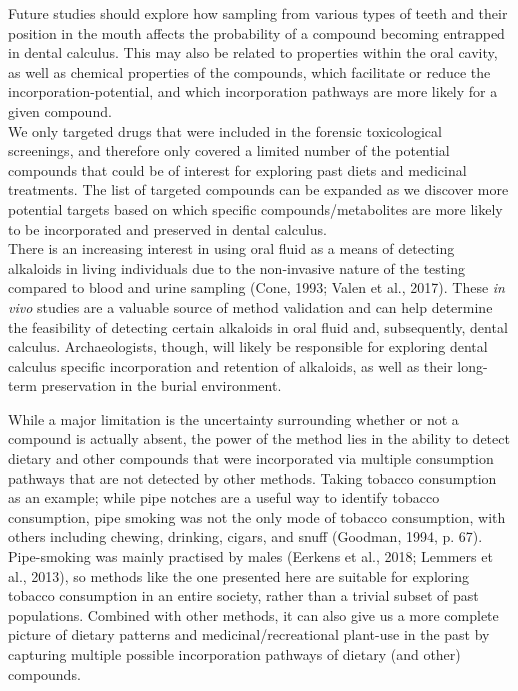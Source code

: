 \documentclass[
]{article}
\begin{document}
Future studies should explore how sampling from various types of teeth
and their position in the mouth affects the probability of a compound
becoming entrapped in dental calculus. This may also be related to
properties within the oral cavity, as well as chemical properties of the
compounds, which facilitate or reduce the incorporation-potential, and
which incorporation pathways are more likely for a given compound.\\
We only targeted drugs that were included in the forensic toxicological
screenings, and therefore only covered a limited number of the potential
compounds that could be of interest for exploring past diets and
medicinal treatments. The list of targeted compounds can be expanded as
we discover more potential targets based on which specific
compounds/metabolites are more likely to be incorporated and preserved
in dental calculus.\\
There is an increasing interest in using oral fluid as a means of
detecting alkaloids in living individuals due to the non-invasive nature
of the testing compared to blood and urine sampling (Cone, 1993; Valen
et al., 2017). These \emph{in vivo} studies are a valuable source of
method validation and can help determine the feasibility of detecting
certain alkaloids in oral fluid and, subsequently, dental calculus.
Archaeologists, though, will likely be responsible for exploring dental
calculus specific incorporation and retention of alkaloids, as well as
their long-term preservation in the burial environment.

While a major limitation is the uncertainty surrounding whether or not a
compound is actually absent, the power of the method lies in the ability
to detect dietary and other compounds that were incorporated via
multiple consumption pathways that are not detected by other methods.
Taking tobacco consumption as an example; while pipe notches are a
useful way to identify tobacco consumption, pipe smoking was not the
only mode of tobacco consumption, with others including chewing,
drinking, cigars, and snuff (Goodman, 1994, p. 67). Pipe-smoking was
mainly practised by males (Eerkens et al., 2018; Lemmers et al., 2013),
so methods like the one presented here are suitable for exploring
tobacco consumption in an entire society, rather than a trivial subset
of past populations. Combined with other methods, it can also give us a
more complete picture of dietary patterns and medicinal/recreational
plant-use in the past by capturing multiple possible incorporation
pathways of dietary (and other) compounds.
\end{document}
